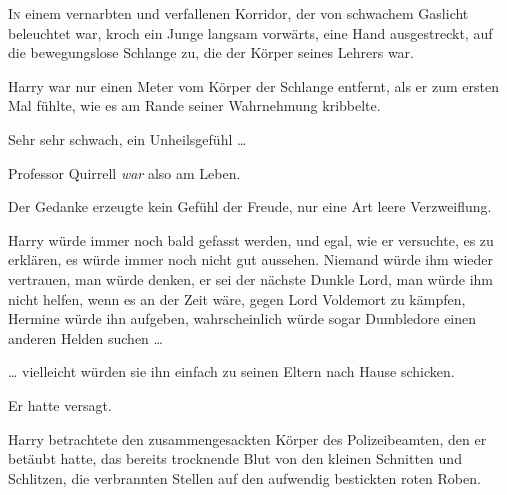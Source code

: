 
\lettrine{I}{n} einem vernarbten und verfallenen Korridor, der von schwachem Gaslicht beleuchtet war, kroch ein Junge langsam vorwärts, eine Hand ausgestreckt, auf die bewegungslose Schlange zu, die der Körper seines Lehrers war.

Harry war nur einen Meter vom Körper der Schlange entfernt, als er zum ersten Mal fühlte, wie es am Rande seiner Wahrnehmung kribbelte.

Sehr sehr schwach, ein Unheilsgefühl …

Professor Quirrell \emph{war} also am Leben.

Der Gedanke erzeugte kein Gefühl der Freude, nur eine Art leere Verzweiflung.

Harry würde immer noch bald gefasst werden, und egal, wie er versuchte, es zu erklären, es würde immer noch nicht gut aussehen. Niemand würde ihm wieder vertrauen, man würde denken, er sei der nächste Dunkle Lord, man würde ihm nicht helfen, wenn es an der Zeit wäre, gegen Lord Voldemort zu kämpfen, Hermine würde ihn aufgeben, wahrscheinlich würde sogar Dumbledore einen anderen Helden suchen …

… vielleicht würden sie ihn einfach zu seinen Eltern nach Hause schicken.

Er hatte versagt.

Harry betrachtete den zusammengesackten Körper des Polizeibeamten, den er betäubt hatte, das bereits trocknende Blut von den kleinen Schnitten und Schlitzen, die verbrannten Stellen auf den aufwendig bestickten roten Roben.

